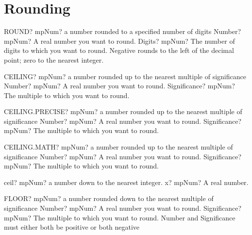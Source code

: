 \documentclass[12pt,a4paper,openany]{book}
\begin{document}
\section{Rounding}

\begin{mpFunctionsExtract}
\mpWorksheetFunctionTwoNotImplemented
{ROUND? mpNum? a number rounded to a specified number of digits}
{Number? mpNum? A real number you want to round.}
{Digits? mpNum? The number of digits to which you want to round. Negative rounds to the left of the decimal point; zero to the nearest integer.}
\end{mpFunctionsExtract}

\begin{mpFunctionsExtract}
\mpWorksheetFunctionTwoNotImplemented
{CEILING? mpNum? a number rounded up to the nearest multiple of significance}
{Number? mpNum? A real number you want to round.}
{Significance? mpNum? The multiple to which you want to round.}
\end{mpFunctionsExtract}

\begin{mpFunctionsExtract}
\mpWorksheetFunctionTwoNotImplemented
{CEILING.PRECISE? mpNum? a number rounded up to the nearest multiple of significance}
{Number? mpNum? A real number you want to round.}
{Significance? mpNum? The multiple to which you want to round.}
\end{mpFunctionsExtract}

\begin{mpFunctionsExtract}
\mpWorksheetFunctionTwoNotImplemented
{CEILING.MATH? mpNum? a number rounded up to the nearest multiple of significance}
{Number? mpNum? A real number you want to round.}
{Significance? mpNum? The multiple to which you want to round.}
\end{mpFunctionsExtract}

\begin{mpFunctionsExtract}
\mpFunctionOne
{ceil? mpNum?  a number down to the nearest integer.}
{x? mpNum? A real number.}
\end{mpFunctionsExtract}

\begin{mpFunctionsExtract}
\mpWorksheetFunctionTwoNotImplemented
{FLOOR? mpNum? a number rounded down to the nearest multiple of significance}
{Number? mpNum? A real number you want to round.}
{Significance? mpNum? The multiple to which you want to round. Number and Significance must either both be positive or both negative}
\end{mpFunctionsExtract}
\end{document}
